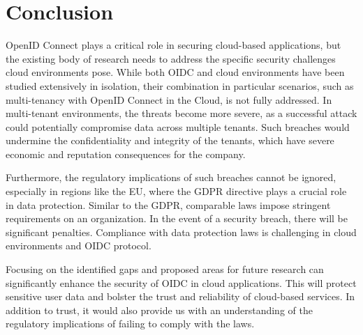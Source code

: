 \section{Conclusion}
OpenID Connect plays a critical role in securing cloud-based applications, but the existing body of research needs to address the specific security challenges cloud environments pose. While both OIDC and cloud environments have been studied extensively in isolation, their combination in particular scenarios, such as multi-tenancy with OpenID Connect in the Cloud, is not fully addressed. In multi-tenant environments, the threats become more severe, as a successful attack could potentially compromise data across multiple tenants. Such breaches would undermine the confidentiality and integrity of the tenants, which have severe economic and reputation consequences for the company.

Furthermore, the regulatory implications of such breaches cannot be ignored, especially in regions like the EU, where the GDPR directive plays a crucial role in data protection. Similar to the GDPR, comparable laws impose stringent requirements on an organization. In the event of a security breach, there will be significant penalties. Compliance with data protection laws is challenging in cloud environments and OIDC protocol. 

Focusing on the identified gaps and proposed areas for future research can significantly enhance the security of OIDC in cloud applications. This will protect sensitive user data and bolster the trust and reliability of cloud-based services. In addition to trust, it would also provide us with an understanding of the regulatory implications of failing to comply with the laws.




 



